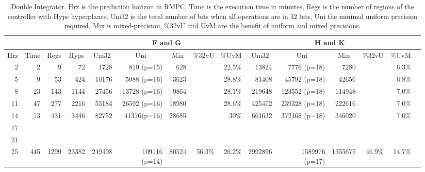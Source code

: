 \begin{table*}[ht]
	\centering
	\caption{Double Integrator.\textmd{ Hrz is the prediction horizon in RMPC, Time is the execution time in minutes, Regs is the number of regions of the controller with Hyps hyperplanes. Uni32 is the total number of bits when all operations are in 32 bits, Uni the minimal uniform precision required, Mix is mixed-precision, \%32vU and UvM are the benefit of uniform and mixed precisions.}}
	\label{tab:di}
	\begin{tabular}{rrrrrrrrrrrrrrr}
		\cline{5-8}
		\cline{8-13}
		\multicolumn{4}{c}{} &
		\multicolumn{5}{c|}{F and G} &
		\multicolumn{5}{c}{H and K} \\
		\hline
		\multicolumn{1}{c}{Hrz}&
		\multicolumn{1}{c}{Time}&
		\multicolumn{1}{c}{Regs} &
		\multicolumn{1}{c}{Hyps} &
		\multicolumn{1}{c}{Uni32}&
		\multicolumn{1}{c}{Uni}&
		\multicolumn{1}{c}{Mix}&
		\multicolumn{1}{c}{\%32vU}&
		\multicolumn{1}{c}{\%UvM}&
		\multicolumn{1}{c}{Uni32}&
		\multicolumn{1}{c}{Uni}&
		\multicolumn{1}{c}{Mix}&
		\multicolumn{1}{c}{\%32vU}&
		\multicolumn{1}{c}{\%UvM} \\
		\hline
		2 & 2 & 9 & 72 & 1728 & 810 (p=15) & 628 &  & 22.5\% & 13824 & 7776 (p=18) & 7280 & & 6.3\% \\
		5 & 9 & 53 & 424 & 10176 & 5088 (p=16) & 3623 &  & 28.8\% & 81408 & 45792 (p=18) & 42656 & & 6.8\% \\
		8 & 23 & 143 & 1144 & 27456 & 13728 (p=16) & 9864 &  & 28.1\% & 219648 & 123552 (p=18) & 114948 & & 7.0\% \\
		11 & 47 & 277 & 2216 & 53184 & 26592 (p=16) & 18980 &  & 28.6\% & 425472 & 239328 (p=18) & 222616 & & 7.0\% \\
		
		14 & 73 & 431& 3446& 82752& 41376(p=16)& 28685&  & 30\% & 661632& 372168 (p=18)& 346020& &7.0\% \\
		
		17 & & & & & & & & & & & & & \\
		
		21 & & & & & & & & & & & & & \\
		
		25 & 445 &1299 & 23382 & 249408 & 109116 (p=14) & 80524 & 56.3\% & 26.2\% & 2992896 & 1589976 (p=17) & 1355675 & 46.9\% & 14.7\% \\
		
	\end{tabular}
\end{table*}